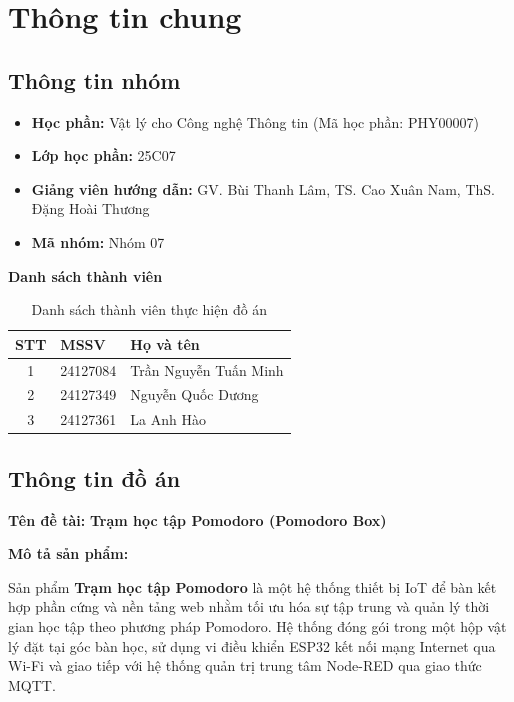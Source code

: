 \section{Thông tin chung}

\subsection{Thông tin nhóm}
\begin{itemize}[leftmargin=1.5cm]
    \item \textbf{Học phần:} Vật lý cho Công nghệ Thông tin (Mã học phần: PHY00007)
    \item \textbf{Lớp học phần:} 25C07
    \item \textbf{Giảng viên hướng dẫn:} GV. Bùi Thanh Lâm, TS. Cao Xuân Nam, ThS. Đặng Hoài Thương
    \item \textbf{Mã nhóm:} Nhóm 07
\end{itemize}

\vspace{0.3cm}
\textbf{Danh sách thành viên}
\begin{table}[htbp]
\centering
\begin{tabular}{|c|l|l|}
\hline
\textbf{STT} & \textbf{MSSV} & \textbf{Họ và tên} \\ \hline
1 & 24127084 & Trần Nguyễn Tuấn Minh \\ \hline
2 & 24127349 & Nguyễn Quốc Dương \\ \hline
3 & 24127361 & La Anh Hào \\ \hline
\end{tabular}
\caption{Danh sách thành viên thực hiện đồ án}
\label{tab:thanh_vien}
\end{table}

\subsection{Thông tin đồ án}

\textbf{Tên đề tài:} \textbf{Trạm học tập Pomodoro (Pomodoro Box)}

\vspace{0.2cm}
\textbf{Mô tả sản phẩm:}

Sản phẩm \textbf{Trạm học tập Pomodoro} là một hệ thống thiết bị IoT để bàn kết hợp phần cứng và nền tảng web nhằm tối ưu hóa sự tập trung và quản lý thời gian học tập theo phương pháp Pomodoro. Hệ thống đóng gói trong một hộp vật lý đặt tại góc bàn học, sử dụng vi điều khiển ESP32 kết nối mạng Internet qua Wi-Fi và giao tiếp với hệ thống quản trị trung tâm Node-RED qua giao thức MQTT.

